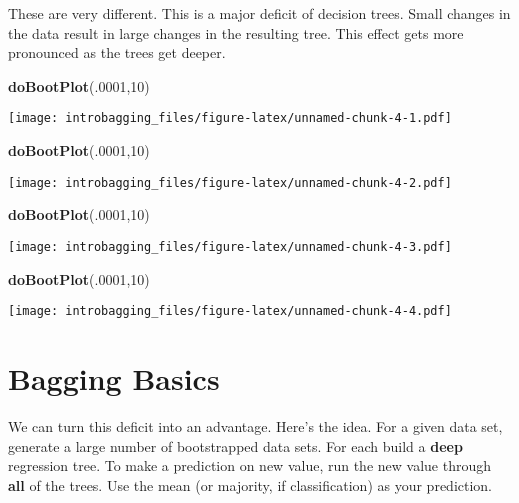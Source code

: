 \documentclass[]{article}
\newenvironment{Shaded}{\begin{snugshade}}{\end{snugshade}}
\newcommand{\DecValTok}[1]{\textcolor[rgb]{0.00,0.00,0.81}{#1}}
\newcommand{\KeywordTok}[1]{\textcolor[rgb]{0.13,0.29,0.53}{\textbf{#1}}}
\newcommand{\NormalTok}[1]{#1}
\begin{document}
These are very different. This is a major deficit of decision trees.
Small changes in the data result in large changes in the resulting tree.
This effect gets more pronounced as the trees get deeper.

\begin{Shaded}
\begin{Highlighting}[]
\KeywordTok{doBootPlot}\NormalTok{(.}\DecValTok{0001}\NormalTok{,}\DecValTok{10}\NormalTok{)}
\end{Highlighting}
\end{Shaded}

\texttt{[image: introbagging\_files/figure-latex/unnamed-chunk-4-1.pdf]}

\begin{Shaded}
\begin{Highlighting}[]
\KeywordTok{doBootPlot}\NormalTok{(.}\DecValTok{0001}\NormalTok{,}\DecValTok{10}\NormalTok{)}
\end{Highlighting}
\end{Shaded}

\texttt{[image: introbagging\_files/figure-latex/unnamed-chunk-4-2.pdf]}

\begin{Shaded}
\begin{Highlighting}[]
\KeywordTok{doBootPlot}\NormalTok{(.}\DecValTok{0001}\NormalTok{,}\DecValTok{10}\NormalTok{)}
\end{Highlighting}
\end{Shaded}

\texttt{[image: introbagging\_files/figure-latex/unnamed-chunk-4-3.pdf]}

\begin{Shaded}
\begin{Highlighting}[]
\KeywordTok{doBootPlot}\NormalTok{(.}\DecValTok{0001}\NormalTok{,}\DecValTok{10}\NormalTok{)}
\end{Highlighting}
\end{Shaded}

\texttt{[image: introbagging\_files/figure-latex/unnamed-chunk-4-4.pdf]}

\hypertarget{bagging-basics}{%
\section{Bagging Basics}\label{bagging-basics}}

We can turn this deficit into an advantage. Here's the idea. For a given
data set, generate a large number of bootstrapped data sets. For each
build a \textbf{deep} regression tree. To make a prediction on new
value, run the new value through \textbf{all} of the trees. Use the mean
(or majority, if classification) as your prediction.
\end{document}
